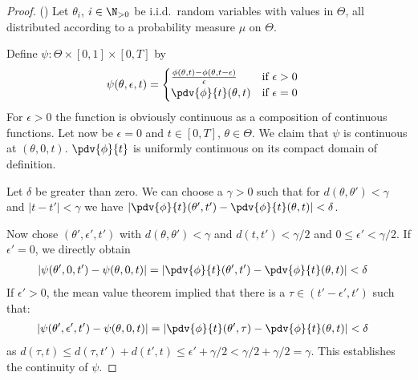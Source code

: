 \begin{proof} ()
%
%
Let $\theta_i$, $i\in\N_{>0}$ be i.i.d.\ random variables
with values in $\Theta$, all distributed according to a probability measure $\mu$ on $\Theta$.

Define $\psi:\Theta\times[0,1]\times [0,T]$ by
%
\begin{align}
	\psi(\theta, \epsilon, t)
	&=
	\begin{cases}
		\frac{\phi(\theta, t)-\phi(\theta,t-\epsilon)}{\epsilon} & \text{if $\epsilon>0$}
	\\	\pdv{\phi}{t}(\theta, t) & \text{if $\epsilon=0$}
	\end{cases}
\end{align}
%
For $\epsilon>0$ the function is obviously continuous as a composition of continuous functions.
Let now be $\epsilon=0$ and $t\in[0,T]$, $\theta\in\Theta$. We claim that $\psi$ is continuous
at $(\theta,0,t)$. $\pdv{\phi}{t}$ is uniformly continuous on its compact domain of definition.

Let $\delta$ be greater than zero. We can choose a $\gamma>0$ such that for ${d(\theta,\theta')<\gamma}$ and ${|t-t'|<\gamma}$ we have ${\left|\pdv{\phi}{t}(\theta', t') - \pdv{\phi}{t}(\theta, t)\right|<\delta}$.

Now chose ${(\theta', \epsilon', t')}$ with ${d(\theta,\theta')<\gamma}$ and $d(t,t')<\gamma/2$ and $0\leq\epsilon'<\gamma/2$.
If $\epsilon'=0$, we directly obtain
%
\begin{align}
	\left|\psi(\theta',0, t') - \psi(\theta, 0, t)\right|
	&=  \left|\pdv{\phi}{t}(\theta',t') - \pdv{\phi}{t}(\theta,t)\right|
	< \delta
\end{align}
%
If $\epsilon'>0$, the mean value theorem implied that there is a $\tau\in(t'-\epsilon',t')$ such that:
%
\begin{align}
	\left|\psi(\theta',\epsilon', t')-\psi(\theta, 0, t)\right|
	&=  \left|\pdv{\phi}{t}(\theta',\tau) - \pdv{\phi}{t}(\theta,t)\right|
	< \delta
\end{align}
%
as ${d(\tau, t) \leq d(\tau,t') + d(t',t) \leq \epsilon'+\gamma/2 < \gamma/2+\gamma/2 = \gamma}$.
This establishes the continuity of $\psi$.


\end{proof}
